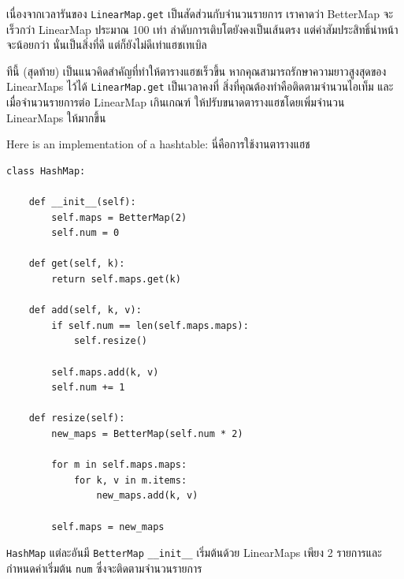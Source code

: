 เนื่องจากเวลารันของ {\tt LinearMap.get} เป็นสัดส่วนกับจำนวนรายการ 
เราคาดว่า BetterMap จะเร็วกว่า LinearMap ประมาณ 100 เท่า 
ลำดับการเติบโตยังคงเป็นเส้นตรง แต่ค่าสัมประสิทธิ์นำหน้าจะน้อยกว่า นั่นเป็นสิ่งที่ดี แต่ก็ยังไม่ดีเท่าแฮชเทเบิล


ทีนี้ (สุดท้าย) เป็นแนวคิดสำคัญที่ทำให้ตารางแฮชเร็วขึ้น หากคุณสามารถรักษาความยาวสูงสุดของ LinearMaps ไว้ได้ 
{\tt LinearMap.get} เป็นเวลาคงที่ สิ่งที่คุณต้องทำคือติดตามจำนวนไอเท็ม
และเมื่อจำนวนรายการต่อ LinearMap เกินเกณฑ์ ให้ปรับขนาดตารางแฮชโดยเพิ่มจำนวน LinearMaps ให้มากขึ้น

Here is an implementation of a hashtable:
นี่คือการใช้งานตารางแฮช

\begin{verbatim}
class HashMap:

    def __init__(self):
        self.maps = BetterMap(2)
        self.num = 0

    def get(self, k):
        return self.maps.get(k)

    def add(self, k, v):
        if self.num == len(self.maps.maps):
            self.resize()

        self.maps.add(k, v)
        self.num += 1

    def resize(self):
        new_maps = BetterMap(self.num * 2)

        for m in self.maps.maps:
            for k, v in m.items:
                new_maps.add(k, v)

        self.maps = new_maps
\end{verbatim}

{\tt HashMap} แต่ละอันมี {\tt BetterMap} \verb"__init__" เริ่มต้นด้วย LinearMaps 
เพียง 2 รายการและกำหนดค่าเริ่มต้น {\tt num} ซึ่งจะติดตามจำนวนรายการ


